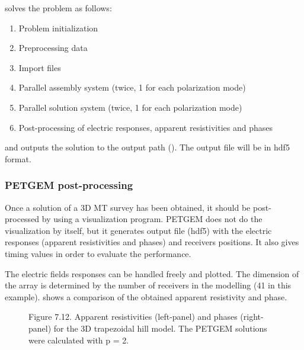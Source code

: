 \documentclass[letterpaper,10pt,english]{sphinxmanual}
\begin{document}
 solves the problem as follows:
\begin{enumerate}
%
\item {} 
Problem initialization

\item {} 
Preprocessing data

\item {} 
Import files

\item {} 
Parallel assembly system (twice, 1 for each polarization mode)

\item {} 
Parallel solution system (twice, 1 for each polarization mode)

\item {} 
Post-processing of electric responses, apparent resistivities and phases

\end{enumerate}

and outputs the solution to the output path
(). The output file will be in hdf5 format.


\subsubsection{PETGEM post-processing}
\label{\detokenize{Manual:id15}}
Once a solution of a 3D MT survey has been obtained, it should be
post-processed by using a visualization program. PETGEM does not do the
visualization by itself, but it generates output file (hdf5)
with the electric responses (apparent resistivities and phases) and
receivers positions. It also gives timing values in order to evaluate the
performance.

The electric fields responses can be handled freely and plotted. The
dimension of the array is determined by the
number of receivers in the modelling (41 in this example). {\hyperref[\detokenize{Manual:figure-7-12}]{}} shows
a comparison of the obtained apparent resistivity and phase.

\begin{figure}[htbp]
\centering
\capstart

\noindent{}
\caption{Figure 7.12. Apparent resistivities (left-panel) and phases (right-panel) for the 3D trapezoidal hill model. The PETGEM solutions were calculated with p = 2.}\label{\detokenize{Manual:id25}}\label{\detokenize{Manual:figure-7-12}}\end{figure}
\end{document}
